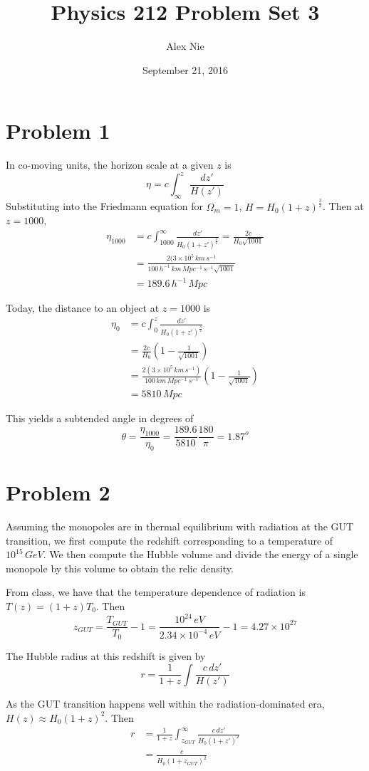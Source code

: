 \documentclass{article}
\title{Physics 212 Problem Set 3}
\author{Alex Nie}
\date{September 21, 2016}
\begin{document}
\maketitle

\section*{Problem 1}
In co-moving units, the horizon scale at a given $z$ is
\[\eta = c\int_\infty^z\frac{dz'}{H(z')}\]
Substituting into the Friedmann equation for $\Omega_m=1$, $H = H_0(1+z)^{\frac{3}{2}}$. Then at $z=1000$, 
\begin{align*}
\eta_1000 &= c\int_{1000}^\infty\frac{dz'}{H_0(1+z')^{\frac{3}{2}}}=\frac{2c}{H_0\sqrt{1001}}\\
&= \frac{2(3\times 10^5\,km\,s^{-1}}{100\,h^{-1}\,km\,Mpc^{-1}\,s^{-1}\sqrt{1001}}\\
&= 189.6\,h^{-1}\,Mpc
\end{align*}

Today, the distance to an object at $z=1000$ is
\begin{align*}
\eta_0 &= c\int_0^z\frac{dz'}{H_0(1+z')^{\frac{3}{2}}}\\
&= \frac{2c}{H_0}\left(1-\frac{1}{\sqrt{1001}}\right)\\
&= \frac{2(3\times 10^5\,km\,s^{-1})}{100\,km\,Mpc^{-1}\,s^{-1}}\left(1-\frac{1}{\sqrt{1001}}\right)\\
&= 5810\,Mpc
\end{align*}

This yields a subtended angle in degrees of 
\[\theta = \frac{\eta_{1000}}{\eta_0} = \frac{189.6}{5810}\frac{180}{\pi}=1.87^o\]
\section*{Problem 2}
Assuming the monopoles are in thermal equilibrium with radiation at the GUT transition, we first compute the redshift corresponding to a temperature of $10^{15}\,GeV$. We then compute the Hubble volume and divide the energy of a single monopole by this volume to obtain the relic density.

From class, we have that the temperature dependence of radiation is $T(z) = (1+z)T_0$. Then
\[z_{GUT} = \frac{T_{GUT}}{T_0}-1=\frac{10^{24}\,eV}{2.34\times 10^{-4}\,eV}-1= 4.27\times 10^{27}\]

The Hubble radius at this redshift is given by 
\[r = \frac{1}{1+z}\int\frac{c\,dz'}{H(z')}\]

As the GUT transition happens well within the radiation-dominated era, $H(z) \approx H_0(1+z)^2$. Then
\begin{align*}
r &= \frac{1}{1+z}\int_{z_{GUT}}^\infty \frac{c\,dz'}{H_0(1+z')^2}\\
&= \frac{c}{H_0(1+z_{GUT})^2}
\end{align*}
\end{document}
